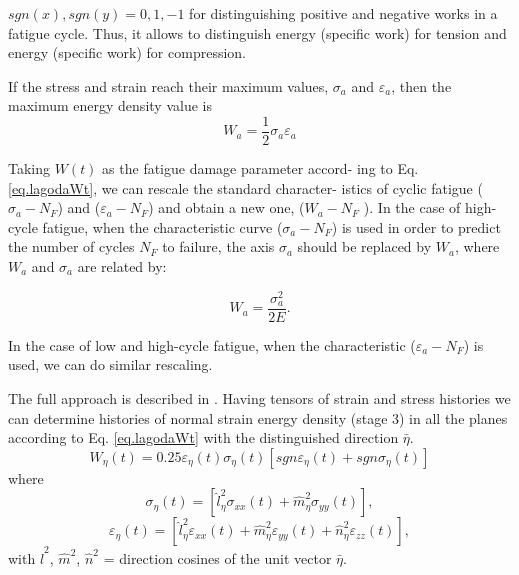 $sgn(x),sgn(y)=0,1,-1$ for distinguishing positive and negative works in a
fatigue cycle. Thus, it allows
to distinguish energy (specific work) for tension and
energy (specific work) for compression. 

If the stress and strain reach their maximum values,
$\sigma_a$ and $\varepsilon_a$, then the maximum energy density value is
\begin{equation}
W_a=\frac{1}{2}\sigma_a\varepsilon_a
\label{eq.lagodaWa}
\end{equation}

Taking $W(t)$ as the fatigue damage parameter accord-
ing to Eq. \ref{eq.lagodaWt}, we can rescale the standard character-
istics of cyclic fatigue ($\sigma_a-N_F$) and ($\varepsilon_a-N_F$) and obtain a new one, ($W_a-N_F$ ). In the case of high-cycle fatigue, when the characteristic curve ($\sigma_a-N_F$) is used in order to predict the number of cycles $N_F$ to failure, the axis $\sigma_a$ should be replaced by $W_a$, where $W_a$ and $\sigma_a$ are related by:

$$W_a=\frac{\sigma_a^2}{2E}.$$

In the case of low and high-cycle fatigue, when the
characteristic ($\varepsilon_a-N_F$) is used, we can do similar rescaling. 
%
%
%

The full approach is described in . Having tensors of strain and stress histories we can
determine histories of normal strain energy density (stage
3) in all the planes according to Eq. \ref{eq.lagodaWt} with the distinguished direction $\bar{\eta}$.
\begin{equation}
W_{\eta}(t)=0.25\varepsilon_\eta(t)\sigma_\eta(t)[sgn\varepsilon_\eta(t)+sgn\sigma_\eta(t)]
\label{eq.lagodaWeta}
\end{equation}
where
\begin{equation}
\sigma_\eta(t)=[\hat{l}^2_\eta\sigma_{xx}(t)+\hat{m}^2_\eta\sigma_{yy}(t)],
\label{eq.lagodasigeta}
\end{equation}
\begin{equation}\varepsilon_\eta(t)=[\hat{l}^2_\eta\varepsilon_{xx}(t)+\hat{m}^2_\eta\varepsilon_{yy}(t)+\hat{n}^2_\eta\varepsilon_{zz}(t)],\label{eq.lagodavareta}
\end{equation}
with $\hat{l}^2$, $\hat{m}^2$, $\hat{n}^2$ = direction cosines of the unit vector $\bar{\eta}$.

